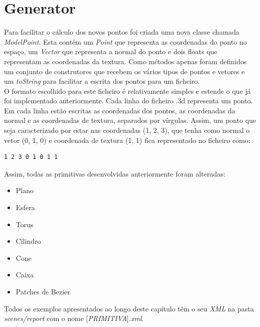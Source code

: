 \documentclass[a4paper]{report}
\begin{document}
\chapter{Generator}
Para facilitar o cálculo dos novos pontos foi criada uma nova classe chamada
\textit{ModelPoint}. Esta contém um \textit{Point} que representa as
coordenadas do ponto no espaço, um \textit{Vector} que representa a normal do
ponto e dois floats que representam as coordenadas da textura. Como métodos
apenas foram definidos um conjunto de construtores que recebem os vários tipos
de pontos e vetores e um \textit{toString} para facilitar a escrita dos pontos
para um ficheiro.\\
O formato escolhido para este ficheiro é relativamente simples e estende o que
já foi implementado anteriormente. Cada linha do ficheiro .3d representa um
ponto. Em cada linha estão escritas as coordenadas dos pontos, as coordenadas
da normal e as coordenadas de textura, separados por vírgulas. Assim, um ponto
que seja caracterizado por estar nas coordenadas (1, 2, 3), que tenha como
normal o vetor (0, 1, 0) e coordenada de textura (1, 1) fica representado no
ficheiro como:

\begin{lstlisting}
1 2 3 0 1 0 1 1
\end{lstlisting}
Assim, todas as primitivas desenvolvidas anteriormente foram alteradas:

\begin{itemize}
        \item Plano
        \item Esfera
        \item Torus
        \item Cilindro
        \item Cone
        \item Caixa
        \item Patches de Bezier
\end{itemize}
Todos os exemplos apresentados ao longo deste capítulo têm o seu \textit{XML} na
pasta \textit{scenes/report} com o nome [\textit{PRIMITIVA}]\textit{.xml}.
\end{document}
